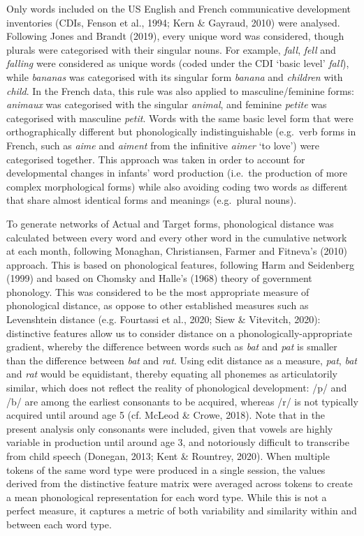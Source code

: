 \documentclass[
  man]{apa6}
\begin{document}
Only words included on the US English and French communicative development inventories (CDIs, Fenson et al., 1994; Kern \& Gayraud, 2010) were analysed. Following Jones and Brandt (2019), every unique word was considered, though plurals were categorised with their singular nouns. For example, \emph{fall}, \emph{fell} and \emph{falling} were considered as unique words (coded under the CDI `basic level' \emph{fall}), while \emph{bananas} was categorised with its singular form \emph{banana} and \emph{children} with \emph{child}. In the French data, this rule was also applied to masculine/feminine forms: \emph{animaux} was categorised with the singular \emph{animal}, and feminine \emph{petite} was categorised with masculine \emph{petit}. Words with the same basic level form that were orthographically different but phonologically indistinguishable (e.g.~verb forms in French, such as \emph{aime} and \emph{aiment} from the infinitive \emph{aimer} `to love') were categorised together. This approach was taken in order to account for developmental changes in infants' word production (i.e.~the production of more complex morphological forms) while also avoiding coding two words as different that share almost identical forms and meanings (e.g.~plural nouns).

To generate networks of Actual and Target forms, phonological distance was calculated between every word and every other word in the cumulative network at each month, following Monaghan, Christiansen, Farmer and Fitneva's (2010) approach. This is based on phonological features, following Harm and Seidenberg (1999) and based on Chomsky and Halle's (1968) theory of government phonology. This was considered to be the most appropriate measure of phonological distance, as oppose to other established measures such as Levenshtein distance (e.g. Fourtassi et al., 2020; Siew \& Vitevitch, 2020): distinctive features allow us to consider distance on a phonologically-appropriate gradient, whereby the difference between words such as \emph{bat} and \emph{pat} is smaller than the difference between \emph{bat} and \emph{rat}. Using edit distance as a measure, \emph{pat}, \emph{bat} and \emph{rat} would be equidistant, thereby equating all phonemes as articulatorily similar, which does not reflect the reality of phonological development: /p/ and /b/ are among the earliest consonants to be acquired, whereas /r/ is not typically acquired until around age 5 (cf. McLeod \& Crowe, 2018). Note that in the present analysis only consonants were included, given that vowels are highly variable in production until around age 3, and notoriously difficult to transcribe from child speech (Donegan, 2013; Kent \& Rountrey, 2020). When multiple tokens of the same word type were produced in a single session, the values derived from the distinctive feature matrix were averaged across tokens to create a mean phonological representation for each word type. While this is not a perfect measure, it captures a metric of both variability and similarity within and between each word type.
\end{document}
